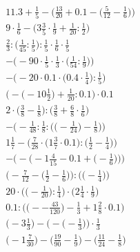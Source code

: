 \documentclass[8pt]{article}
\begin{document}
\begin{align}
11.3 + \frac{1}{5} - \Big(\frac{13}{20} + 0.1 - \big(\frac{5}{12} - \frac{1}{6}\big)\Big) \\
9 \cdot \frac{1}{6} - \big(3\frac{3}{5} \cdot \frac{1}{9} + \frac{1}{20} : \frac{1}{2}\big) \\
\frac{2}{3} : \big(\frac{1}{45} : \frac{1}{5}\big) : \frac{1}{5} \cdot \frac{1}{6} \cdot \frac{1}{5} \\
-\Big(-90 \cdot \frac{1}{5} \cdot \frac{1}{3} \cdot \big(\frac{1}{54} : \frac{1}{9}\big)\Big) \\
-\Big(-20 \cdot 0.1 \cdot \big(0.4 \cdot \frac{1}{4}\big) : \frac{1}{5}\Big) \\
\Big(-\big(-10\frac{1}{2}\big) + \frac{1}{20} : 0.1\Big) \cdot 0.1 \\
2 \cdot \big(\frac{3}{8} - \frac{1}{8}\big) : \big(\frac{3}{8} + \frac{6}{8} \cdot \frac{1}{6}\big) \\
-\bigg(-\frac{1}{48} : \frac{1}{8} : \Big(\big(-\frac{1}{24}\big) - \frac{1}{8}\Big)\bigg) \\
1\frac{1}{7} - \Big(\frac{7}{28} \cdot \big(1\frac{3}{7} \cdot 0.1\big) : \big(\frac{1}{2} - \frac{1}{4}\big)\Big) \\
-\bigg(-\Big(-1\frac{4}{15} - 0.1 + \big(-\frac{1}{6}\big)\Big)\bigg) \\
\Big(-\frac{7}{12} - \big(\frac{1}{2} - \frac{1}{6}\big)\Big) : \Big(\big(-\frac{1}{4}\big)\Big) \\
20 \cdot \Big(\big(-\frac{1}{20}\big) : \frac{1}{4}\Big) \cdot \Big(2\frac{1}{4} \cdot \frac{1}{9}\Big) \\
0.1 : \Big(\big(--\frac{43}{120}\big) - \frac{1}{3} + 1\frac{2}{8} \cdot 0.1\Big) \\
\Big(-3\frac{1}{3}\Big) - \Big(-\big(-\frac{1}{3}\big)\Big) \cdot \frac{1}{3} \\
\big(-1\frac{7}{30}\big) - \big(\frac{19}{90} - \frac{1}{9}\big) - \big(\frac{11}{24} - \frac{1}{8}\big)
\end{align}
\end{document}
